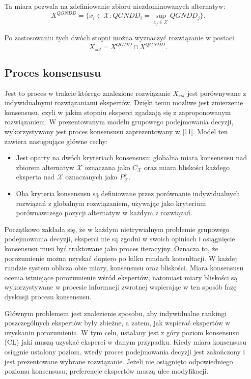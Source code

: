 Ta miara pozwala na zdefiniowanie zbioru niezdominowanych alternatyw:
\begin{equation}
X^{QGNDD} = \{ x_i \in \mathcal{X} : QGNDD_i = \sup_{x_j \in \mathcal{X}}
QGNDD_j
\}.
\end{equation}

Po zastosowaniu tych dwóch stopni można wyznaczyć rozwiązanie w postaci
\begin{equation}
X_{sol} = X^{QGDD} \cap X^{QGNDD}.
\end{equation}

\subsection{Proces konsensusu}
Jest to proces w trakcie którego znalezione rozwiązanie $X_{sol}$ jest
porównywane z indywidualnymi rozwiązaniami ekspertów. Dzięki temu możliwe jest
zmierzenie konsensusu, czyli w jakim stopniu eksperci zgadzają się z
zaproponowanym rozwiązaniem. W prezentowanym modelu grupowego podejmowania
decyzji, wykorzystywany jest proces konsensusu zaprezentowany w [11]. Model ten
zawiera następujące główne cechy:
\begin{itemize}
  \item Jest oparty na dwóch kryteriach konsensusu: globalna miara konsensusu
  nad zbiorem alternatyw $\mathcal{X}$ oznaczana jako $C_{\mathcal{X}}$ oraz
  miara bliskości każdego eksperta nad $\mathcal{X}$ oznaczanych jako
  $P^k_{\mathcal{X}}$.
  \item Oba kryteria konsensusu są definiowane przez porównanie indywidualnych
  rozwiązań z globalnym rozwiązaniem, używając jako kryterium porównawczego
  pozycji alternatyw w każdym z rozwiązań.
\end{itemize}

Początkowo zakłada się, że w każdym nietrywialnym problemie grupowego
podejmowania decyzji, eksperci nie są zgodni w swoich opiniach i osiągnięcie
konsensusu musi być traktowane jako proces iteracyjny. Oznacza to, że
porozumienie można uzyskać dopiero po kilku rundach konsultacji. W każdej
rundzie system oblicza obie miary, konsensusu oraz bliskości. Miara konsensusu
ocenia istniejące porozumienie wśród ekspertów, natomiast miary bliskości są
wykorzystywane w procesie informacji zwrotnej wspierając w ten sposób fazę
dyskusji procesu konsensusu.

Głównym problemem jest znalezienie sposobu, aby indywidualne rankingi
poszczególnych ekspertów były zbieżne, a zatem, jak wspierać ekspertów w
uzyskaniu porozumienia. W tym celu, ustalany jest z góry poziom konsensusu (CL)
jaki muszą uzyskać eksperci w danym przypadku. Kiedy miara konsensusu osiągnie
ustalony poziom, wtedy proces podejmowania decyzji jest zakończony i jest
prezentowane wybrane rozwiązanie. Jeżeli nie osiągnięto odpowiedniego poziomu
konsensusu, preferencje ekspertów muszą ulec modyfikacji.

